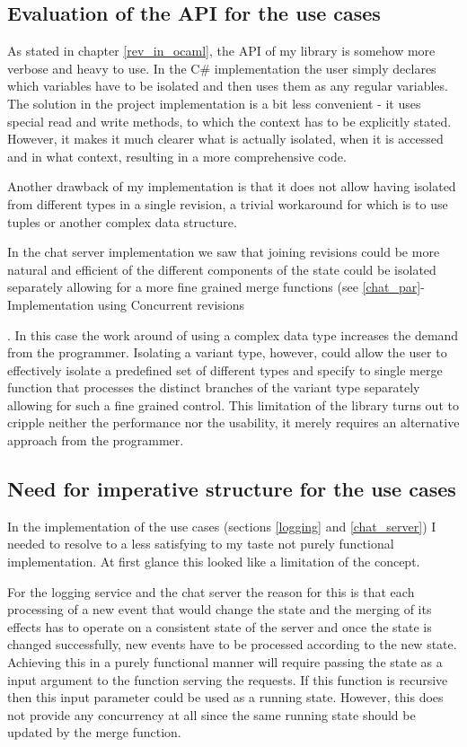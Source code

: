 \documentclass[12pt,twoside,notitlepage]{report}
\begin{document}
{\subsection{Evaluation of the API for the use cases}
\label{eval_api}
As stated in chapter \ref{rev_in_ocaml}, the API of my library is somehow more verbose and heavy to use. In the C\# implementation the user simply declares which variables have to be isolated and then uses them as any regular variables. The solution in the project implementation is a bit less convenient - it uses special read and write methods, to which the context has to be explicitly stated. However, it makes it much clearer what is actually isolated, when it is accessed and in what context, resulting in a more comprehensive code.  

Another drawback of my implementation is that it does not allow having isolated from different types in a single revision, a trivial workaround for which is to use tuples or another complex data structure. 

In the chat server implementation we saw that joining revisions could be more natural and efficient of the different components of the state could be isolated separately allowing for a more fine grained merge functions (see \ref{chat_par}-Implementation using Concurrent revisions}. In this case the work around of using a complex data type increases the demand from the programmer. Isolating a variant type, however, could allow the user to effectively isolate a predefined set of different types and specify to single merge function that processes the distinct branches of the variant type separately allowing for such a fine grained control. This limitation of the library turns out to cripple neither the performance nor the usability, it merely requires an alternative approach from the programmer.  

\subsection{Need for imperative structure for the use cases}
\label{eval_imp}
In the implementation of the use cases (sections \ref{logging} and \ref{chat_server}) I needed to resolve to a less satisfying to my taste not purely functional implementation. At first glance this looked like a limitation of the concept.

For the logging service and the chat server the reason for this is that each processing of a new event that would change the state and the merging of its effects has to operate on a consistent state of the server and once the state is changed successfully, new events have to be processed according to the new state.  Achieving this in a purely functional manner will require passing the state as a input argument to the function serving the requests. If this function is recursive then this input parameter could be used as a running state. However, this does not provide any concurrency at all since the same running state should be updated by the merge function.
\end{document}
